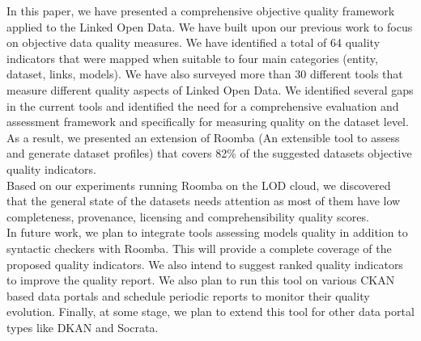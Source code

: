 \documentclass[onecolumn, crcready]{iosart2c}
\begin{document}
In this paper, we have presented a comprehensive objective quality framework applied to the Linked Open Data. We have built upon our previous work to focus on objective data quality measures. We have identified a total of 64 quality indicators that were mapped when suitable to four main categories (entity, dataset, links, models). We have also surveyed more than 30 different tools that measure different quality aspects of Linked Open Data. We identified several gaps in the current tools and identified the need for a comprehensive evaluation and assessment framework and specifically for measuring quality on the dataset level. As a result, we presented an extension of Roomba (An extensible tool to assess and generate dataset profiles) that covers 82\% of the suggested datasets objective quality indicators.\\
Based on our experiments running Roomba on the LOD cloud, we discovered that the general state of the datasets needs attention as most of them have low completeness, provenance, licensing and comprehensibility quality scores.\\
In future work, we plan to integrate tools assessing models quality in addition to syntactic checkers with Roomba. This will provide a complete coverage of the proposed quality indicators. We also intend to suggest ranked quality indicators to improve the quality report. We also plan to run this tool on various CKAN based data portals and schedule periodic reports to monitor their quality evolution. Finally, at some stage, we plan to extend this tool for other data portal types like DKAN and Socrata.



\end{document}
